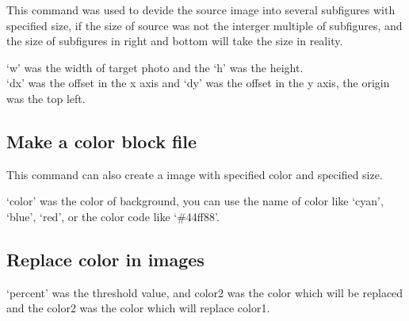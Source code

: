 \documentclass[12pt]{article}
\begin{document}
This command was used to devide the source image into several subfigures with specified size, if the size of source was not the interger multiple of subfigures, and the size of subfigures in right and bottom will take the size in reality.\\

{\centering{}\par}\vspace{5mm}

`w' was the width of target photo and the `h' was the height.\\
`dx' was the offset in the x axis and `dy' was the offset in the y axis, the origin was the top left.

\subsection{Make a color block file}
{\centering{}\par}\vspace{5mm}

This command can also create a image with specified color and specified size.\\

{\centering{}\par}\vspace{5mm}

`color' was the color of background, you can use the name of color like `cyan', `blue', `red', or the color code like `\#44f\mbox{}f88'.

\subsection{Replace color in images}
{\centering{}\par}\vspace{5mm}

`percent' was the threshold value, and color2 was the color which will be replaced and the color2 was the color which will replace color1.\\

{\centering{}\par}\vspace{5mm}
\end{document}
